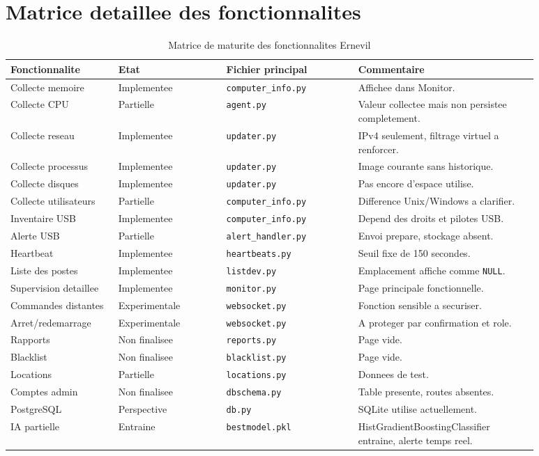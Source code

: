 \documentclass[12pt,a4paper]{report}
\begin{document}
\section{Matrice detaillee des fonctionnalites}
\begin{longtable}{p{0.18\linewidth}p{0.18\linewidth}p{0.22\linewidth}p{0.30\linewidth}}
\caption{Matrice de maturite des fonctionnalites Ernevil}\\
\toprule
\textbf{Fonctionnalite} & \textbf{Etat} & \textbf{Fichier principal} & \textbf{Commentaire}\\
\midrule
Collecte memoire & Implementee & \texttt{computer\_info.py} & Affichee dans Monitor.\\
Collecte CPU & Partielle & \texttt{agent.py} & Valeur collectee mais non persistee completement.\\
Collecte reseau & Implementee & \texttt{updater.py} & IPv4 seulement, filtrage virtuel a renforcer.\\
Collecte processus & Implementee & \texttt{updater.py} & Image courante sans historique.\\
Collecte disques & Implementee & \texttt{updater.py} & Pas encore d'espace utilise.\\
Collecte utilisateurs & Partielle & \texttt{computer\_info.py} & Difference Unix/Windows a clarifier.\\
Inventaire USB & Implementee & \texttt{computer\_info.py} & Depend des droits et pilotes USB.\\
Alerte USB & Partielle & \texttt{alert\_handler.py} & Envoi prepare, stockage absent.\\
Heartbeat & Implementee & \texttt{heartbeats.py} & Seuil fixe de 150 secondes.\\
Liste des postes & Implementee & \texttt{listdev.py} & Emplacement affiche comme \texttt{NULL}.\\
Supervision detaillee & Implementee & \texttt{monitor.py} & Page principale fonctionnelle.\\
Commandes distantes & Experimentale & \texttt{websocket.py} & Fonction sensible a securiser.\\
Arret/redemarrage & Experimentale & \texttt{websocket.py} & A proteger par confirmation et role.\\
Rapports & Non finalisee & \texttt{reports.py} & Page vide.\\
Blacklist & Non finalisee & \texttt{blacklist.py} & Page vide.\\
Locations & Partielle & \texttt{locations.py} & Donnees de test.\\
Comptes admin & Non finalisee & \texttt{dbschema.py} & Table presente, routes absentes.\\
PostgreSQL & Perspective & \texttt{db.py} & SQLite utilise actuellement.\\
IA partielle & Entraine & \texttt{bestmodel.pkl} & HistGradientBoostingClassifier entraine, alerte temps reel.\\
\bottomrule
\end{longtable}
\end{document}
